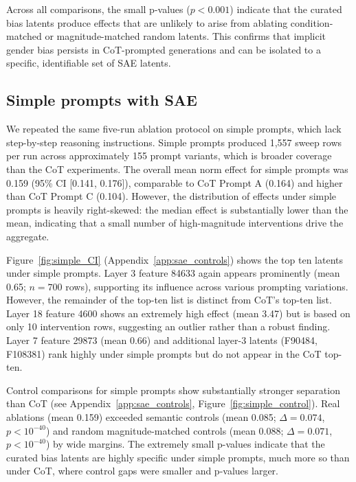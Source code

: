 \documentclass{article}
\begin{document}
Across all comparisons, the small p-values ($p < 0.001$) indicate that the curated bias latents produce effects that are unlikely to arise from ablating condition-matched or magnitude-matched random latents. This confirms that implicit gender bias persists in CoT-prompted generations and can be isolated to a specific, identifiable set of SAE latents.




\subsection{Simple prompts with SAE}

We repeated the same five-run ablation protocol on simple prompts, which lack step-by-step reasoning instructions. Simple prompts produced 1,557 sweep rows per run across approximately 155 prompt variants, which is broader coverage than the CoT experiments.
The overall mean norm effect for simple prompts was 0.159 (95\% CI [0.141, 0.176]), comparable to CoT Prompt A (0.164) and higher than CoT Prompt C (0.104). However, the distribution of effects under simple prompts is heavily right-skewed: the median effect is substantially lower than the mean, indicating that a small number of high-magnitude interventions drive the aggregate.

Figure~\ref{fig:simple_CI} (Appendix~\ref{app:sae_controls}) shows the top ten latents under simple prompts. Layer 3 feature 84633 again appears prominently (mean 0.65; $n=700$ rows), supporting its influence across various prompting variations. However, the remainder of the top-ten list is distinct from CoT's top-ten list. Layer 18 feature 4600 shows an extremely high effect (mean 3.47) but is based on only 10 intervention rows, suggesting an outlier rather than a robust finding. Layer 7 feature 29873 (mean 0.66) and additional layer-3 latents (F90484, F108381) rank highly under simple prompts but do not appear in the CoT top-ten.



Control comparisons for simple prompts show substantially stronger separation than CoT (see Appendix~\ref{app:sae_controls}, Figure~\ref{fig:simple_control}). Real ablations (mean 0.159) exceeded semantic controls (mean 0.085; $\Delta = 0.074$, $p < 10^{-40}$) and random magnitude-matched controls (mean 0.088; $\Delta = 0.071$, $p < 10^{-40}$) by wide margins. The extremely small p-values indicate that the curated bias latents are highly specific under simple prompts, much more so than under CoT, where control gaps were smaller and p-values larger.
\end{document}

